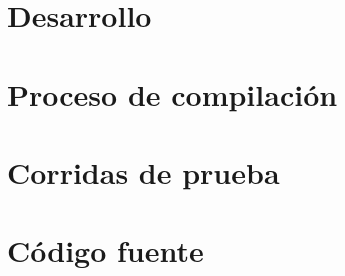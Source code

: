 \documentclass[11pt,a4paper]{article}
\begin{document}
		

	\setcounter{page}{1}
	\section{Desarrollo}			\label{sec:development}
		

	\section{Proceso de compilación} 	\label{sec:comp}
		

	\section{Corridas de prueba}
		
	
	\section{Código fuente}
		
\end{document}
